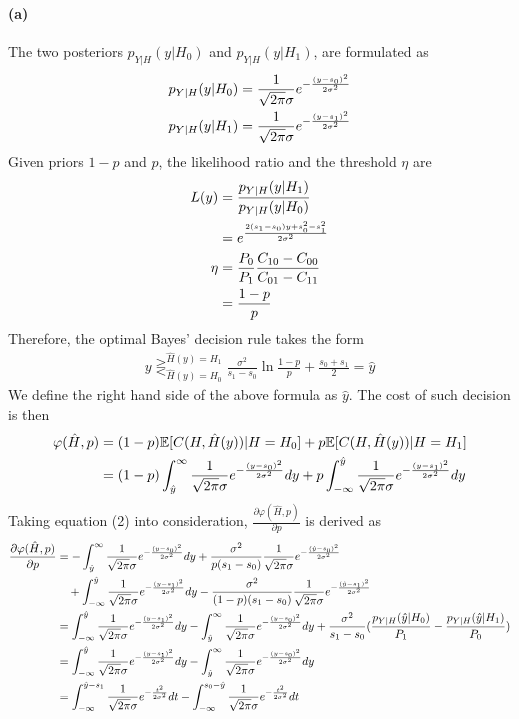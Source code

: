 \documentclass{article}
\begin{document}
\paragraph{(a)}
The two posteriors $p_{Y|H}(y|H_0)$ and $p_{Y|H}(y|H_1)$, are formulated as
\begin{align}
	p_{Y|H}(y|H_0)&=\frac{1}{\sqrt{2\pi}\sigma}e^{-\frac{(y-s_0)^2}{2\sigma^2}}\notag\\
	p_{Y|H}(y|H_1)&=\frac{1}{\sqrt{2\pi}\sigma}e^{-\frac{(y-s_1)^2}{2\sigma^2}}\notag
\end{align}
Given priors $1-p$ and $p$, the likelihood ratio and the threshold $\eta$ are
\begin{align}
	L(y)&=\frac{p_{Y|H}(y|H_1)}{p_{Y|H}(y|H_0)}\notag\\
	&=e^{\frac{2(s_1-s_0)y+s_0^2-s_1^2}{2\sigma^2}}\notag\\
	\eta&=\frac{P_0}{P_1}\frac{C_{10}-C_{00}}{C_{01}-C_{11}}\notag\\
	&=\frac{1-p}{p}\notag
\end{align}
Therefore, the optimal Bayes' decision rule takes the form
\begin{align}
	y\mathop{\gtreqless}^{\hat{H}(y)=H_1}_{\hat{H}(y)=H_0}\frac{\sigma^2}{s_1-s_0}\ln\frac{1-p}{p}+\frac{s_0+s_1}{2} = \hat{y}
\end{align}
We define the right hand side of the above formula as $\hat{y}$. The cost of such decision is then
\begin{align}
	\varphi(\hat{H},p)&=(1-p)\mathbb{E}[C(H,\hat{H}(y))|H=H_0]+p\mathbb{E}[C(H,\hat{H}(y))|H=H_1]\notag\\
	&=(1-p)\int^{\infty}_{\hat{y}}\frac{1}{\sqrt{2\pi}\sigma}e^{-\frac{(y-s_0)^2}{2\sigma^2}}dy+p\int^{\hat{y}}_{-\infty}\frac{1}{\sqrt{2\pi}\sigma}e^{-\frac{(y-s_1)^2}{2\sigma^2}}dy\notag
\end{align}
Taking equation (2) into consideration, $\frac{\partial \varphi(\hat{H},p)}{\partial p}$ is derived as
\begin{align}
	\frac{\partial \varphi(\hat{H},p)}{\partial p}&=-\int_{\hat{y}}^{\infty}\frac{1}{\sqrt{2\pi}\sigma}e^{-\frac{(y-s_0)^2}{2\sigma^2}}dy+\frac{\sigma^2}{p(s_1-s_0)}\frac{1}{\sqrt{2\pi}\sigma}e^{-\frac{(\hat{y}-s_0)^2}{2\sigma^2}}\notag\\
	&\quad +\int^{\hat{y}}_{-\infty}\frac{1}{\sqrt{2\pi}\sigma}e^{-\frac{(y-s_1)^2}{2\sigma^2}}dy-\frac{\sigma^2}{(1-p)(s_1-s_0)}\frac{1}{\sqrt{2\pi}\sigma}e^{-\frac{(\hat{y}-s_1)^2}{2\sigma^2}}\notag\\
	&=\int^{\hat{y}}_{-\infty}\frac{1}{\sqrt{2\pi}\sigma}e^{-\frac{(y-s_1)^2}{2\sigma^2}}dy-\int_{\hat{y}}^{\infty}\frac{1}{\sqrt{2\pi}\sigma}e^{-\frac{(y-s_0)^2}{2\sigma^2}}dy+\frac{\sigma^2}{s_1-s_0}(\frac{p_{Y|H}(\hat{y}|H_0)}{P_1}-\frac{p_{Y|H}(\hat{y}|H_1)}{P_0})\notag\\
	&=\int^{\hat{y}}_{-\infty}\frac{1}{\sqrt{2\pi}\sigma}e^{-\frac{(y-s_1)^2}{2\sigma^2}}dy-\int_{\hat{y}}^{\infty}\frac{1}{\sqrt{2\pi}\sigma}e^{-\frac{(y-s_0)^2}{2\sigma^2}}dy\notag\\
	&=\int^{\hat{y}-s_1}_{-\infty}\frac{1}{\sqrt{2\pi}\sigma}e^{-\frac{t^2}{2\sigma^2}}dt-\int^{s_0-\hat{y}}_{-\infty}\frac{1}{\sqrt{2\pi}\sigma}e^{-\frac{t^2}{2\sigma^2}}dt\notag
\end{align}
\end{document}
